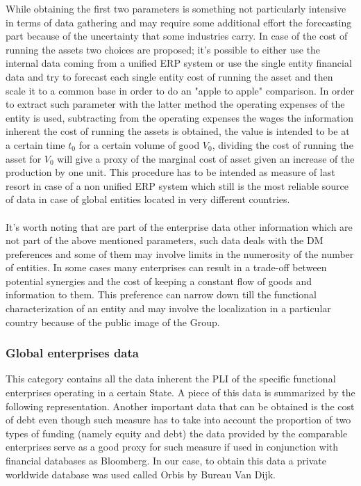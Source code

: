 \begin{doublespace}
While obtaining the first two parameters is something not particularly intensive in terms of data gathering and may require some additional effort the forecasting part because of the uncertainty that some industries carry. In case of the cost of running the assets two choices are proposed; it's possible to either use the internal data coming from a unified ERP system or use the single entity financial data and try to forecast each single entity cost of running the asset and then scale it to a common base in order to do an "apple to apple" comparison. In order to extract such parameter with the latter method the  operating expenses of the entity\cite{Williams2008} is used, subtracting from the operating expenses the wages the information inherent the cost of running the assets is obtained, the value is intended to be at a certain time $t_0$ for a certain volume of good $V_0$, dividing the cost of running the asset for $V_0$ will give a proxy of the marginal cost of asset given an increase of the production by one unit. This procedure has to be intended as measure of last resort in case of a non unified ERP system which still is the most reliable source of data in case of global entities located in very different countries. 
\\
\\
It's worth noting that are part of the enterprise data other information which are not part of the above mentioned parameters, such data deals with the DM preferences and some of them may involve limits in the numerosity of the number of entities. In some cases many enterprises can result in a trade-off between potential synergies and the cost of keeping a constant flow of goods and information to them. This preference can narrow down till the functional characterization of an entity and may involve the localization in a particular country because of the public image of the Group.

\subsubsection{Global enterprises data}
This category contains all the data inherent the PLI of the specific functional enterprises operating in a certain State.
A piece of this data is summarized by the following representation. Another important data that can be obtained is the cost of debt \cite{Berman2013} even though such measure has to take into account the proportion of two types of funding (namely equity and debt) the data provided by the comparable enterprises serve as a good proxy for such measure if used in conjunction with financial databases as Bloomberg. In our case, to obtain this data a private worldwide database was used called Orbis by Bureau Van Dijk.


\end{doublespace}
